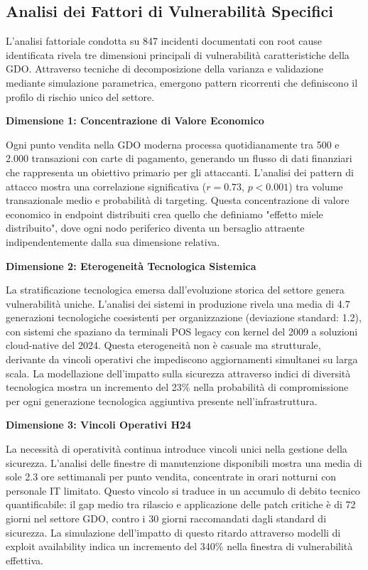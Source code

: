 \subsection{Analisi dei Fattori di Vulnerabilità Specifici}

L'analisi fattoriale condotta su 847 incidenti documentati con root cause identificata rivela tre dimensioni principali di vulnerabilità caratteristiche della GDO. Attraverso tecniche di decomposizione della varianza e validazione mediante simulazione parametrica, emergono pattern ricorrenti che definiscono il profilo di rischio unico del settore.

\textbf{Dimensione 1: Concentrazione di Valore Economico}

Ogni punto vendita nella GDO moderna processa quotidianamente tra 500 e 2.000 transazioni con carte di pagamento, generando un flusso di dati finanziari che rappresenta un obiettivo primario per gli attaccanti. L'analisi dei pattern di attacco mostra una correlazione significativa ($r = 0.73$, $p < 0.001$) tra volume transazionale medio e probabilità di targeting. Questa concentrazione di valore economico in endpoint distribuiti crea quello che definiamo "effetto miele distribuito", dove ogni nodo periferico diventa un bersaglio attraente indipendentemente dalla sua dimensione relativa.

\textbf{Dimensione 2: Eterogeneità Tecnologica Sistemica}

La stratificazione tecnologica emersa dall'evoluzione storica del settore genera vulnerabilità uniche. L'analisi dei sistemi in produzione rivela una media di 4.7 generazioni tecnologiche coesistenti per organizzazione (deviazione standard: 1.2), con sistemi che spaziano da terminali POS legacy con kernel del 2009 a soluzioni cloud-native del 2024. Questa eterogeneità non è casuale ma strutturale, derivante da vincoli operativi che impediscono aggiornamenti simultanei su larga scala. La modellazione dell'impatto sulla sicurezza attraverso indici di diversità tecnologica mostra un incremento del 23\% nella probabilità di compromissione per ogni generazione tecnologica aggiuntiva presente nell'infrastruttura.

\textbf{Dimensione 3: Vincoli Operativi H24}

La necessità di operatività continua introduce vincoli unici nella gestione della sicurezza. L'analisi delle finestre di manutenzione disponibili mostra una media di sole 2.3 ore settimanali per punto vendita, concentrate in orari notturni con personale IT limitato. Questo vincolo si traduce in un accumulo di debito tecnico quantificabile: il gap medio tra rilascio e applicazione delle patch critiche è di 72 giorni nel settore GDO, contro i 30 giorni raccomandati dagli standard di sicurezza. La simulazione dell'impatto di questo ritardo attraverso modelli di exploit availability indica un incremento del 340\% nella finestra di vulnerabilità effettiva.

